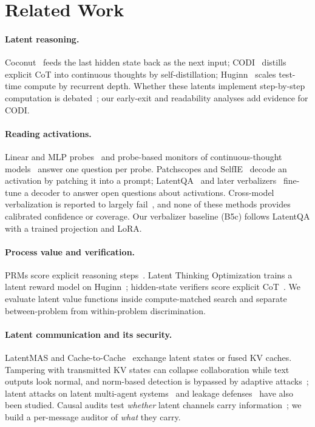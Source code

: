\section{Related Work}
\label{sec:related}

\paragraph{Latent reasoning.} Coconut~\cite{hao2024coconut} feeds the last hidden state back as the next input; CODI~\cite{shen2025codi} distills explicit CoT into continuous thoughts by self-distillation; Huginn~\cite{geiping2025huginn} scales test-time compute by recurrent depth. Whether these latents implement step-by-step computation is debated~\cite{latentcot_reason}; our early-exit and readability analyses add evidence for CODI.

\paragraph{Reading activations.} Linear and MLP probes~\cite{alain2016probes} and probe-based monitors of continuous-thought models~\cite{ulterior} answer one question per probe. Patchscopes and SelfIE~\cite{ghandeharioun2024patchscopes,chen2024selfie} decode an activation by patching it into a prompt; LatentQA~\cite{pan2024latentqa} and later verbalizers~\cite{uav,fav} fine-tune a decoder to answer open questions about activations. Cross-model verbalization is reported to largely fail~\cite{privileged}, and none of these methods provides calibrated confidence or coverage. Our verbalizer baseline (B5c) follows LatentQA with a trained projection and LoRA.

\paragraph{Process value and verification.} PRMs score explicit reasoning steps~\cite{lightman2024verify,wang2024mathshepherd}. Latent Thinking Optimization trains a latent reward model on Huginn~\cite{lto}; hidden-state verifiers score explicit CoT~\cite{hsrm,clue}. We evaluate latent value functions inside compute-matched search and separate between-problem from within-problem discrimination.

\paragraph{Latent communication and its security.} LatentMAS and Cache-to-Cache~\cite{latentmas,c2c} exchange latent states or fused KV caches. Tampering with transmitted KV states can collapse collaboration while text outputs look normal, and norm-based detection is bypassed by adaptive attacks~\cite{latentlie}; latent attacks on latent multi-agent systems~\cite{latentattack} and leakage defenses~\cite{lcguard} have also been studied. Causal audits test \emph{whether} latent channels carry information~\cite{latentpay,latentcomm}; we build a per-message auditor of \emph{what} they carry.

